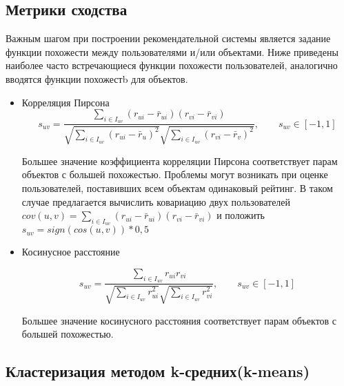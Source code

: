 \documentclass[12pt]{article} %
\begin{document}
\subsection{Метрики сходства}
Важным шагом при построении рекомендательной системы является задание функции похожести между пользователями и/или объектами. Ниже приведены наиболее часто встречающиеся функции похожести пользователей, аналогично вводятся функции похожестb для объектов.
\begin{itemize}

\item{Корреляция Пирсона}
\[
s_{uv} = \frac{\sum_{i \in I_{uv}} (r_{ui} - \bar{r}_{ui})(r_{vi} - \bar{r}_{vi})}{\sqrt{\sum_{i \in I_{uv}}  (r_{ui} - \bar{r}_{u})^2} \sqrt{\sum_{i \in I_{uv}}  (r_{vi} - \bar{r}_{v})^2}},\qquad s_{uv} \in [-1, 1] 
\]

Большее значение коэффициента корреляции Пирсона соответствует парам объектов с большей похожестью. Проблемы могут возникать при оценке пользователей, поставивших всем объектам одинаковый рейтинг. В таком случае предлагается вычислить ковариацию двух пользователей\\ $cov(u, v) = \sum_{i \in I_{uv}} (r_{ui} - \bar{r}_{ui})(r_{vi} - \bar{r}_{vi})$ и положить $s_{uv}=sign(cos(u,v)) * 0,5$



\item{Косинусное расстояние}

\[
s_{uv} = \frac{\sum_{i \in I_{uv}} r_{ui}r_{vi}} {\sqrt{\sum_{i \in I_{uv}} r_{ui}^2} \sqrt{\sum_{i \in I_{uv}} r_{vi}^2}},\qquad s_{uv} \in [-1, 1] 
\]

Большее значение косинусного расстояния соответствует парам объектов с большей похожестью.

\end{itemize}
\subsection{Кластеризация методом k-средних(k-means)}
\end{document}
